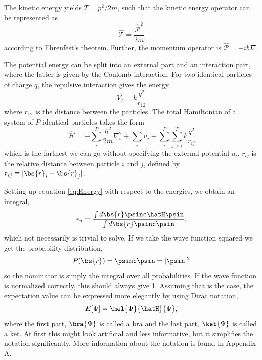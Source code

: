 The kinetic energy yields $T=p^2/2m$, such that the kinetic energy operator can be represented as 
\begin{equation}
\hat{\mathcal{T}}=\frac{\hat{\mathcal{P}}^2}{2m}
\end{equation}
according to Ehrenfest's theorem. Further, the momentum operator is $\hat{\mathcal{P}}=-i\hbar\nabla$.

The potential energy can be split into an external part and an interaction part, where the latter is given by the Coulomb interaction. For two identical particles of charge $q$, the repulsive interaction gives the energy
\begin{equation}
V_I=k\frac{q^2}{r_{12}}
\end{equation}
where $r_{12}$ is the distance between the particles. The total Hamiltonian of a system of $P$ identical particles takes the form
\begin{equation}
\hat{\mathcal{H}}=-\sum_i^P\frac{\hbar^2}{2m}\nabla_i^2+\sum_i^{}u_i + \sum_i^P\sum_{j>i}^Pk\frac{q^2}{r_{ij}}
\label{eq:ElectronicHamiltonian}
\end{equation}
which is the farthest we can go without specifying the external potential $u_i$. $r_{ij}$ is the relative distance between particle $i$ and $j$, defined by $r_{ij}\equiv|\bs{r}_i-\bs{r}_j|$.

Setting up equation \eqref{eq:Energy} with respect to the energies, we obtain an integral,
\begin{equation}
\epsilon_n=\frac{\int d\bs{r}\psinc\hatH\psin}{\int d\bs{r}\psinc\psin},
\label{eq:energyintegral}
\end{equation}
which not necessarily is trivial to solve. If we take the wave function squared we get the probability distribution,
\begin{equation}
P(\bs{r})=\psinc\psin=|\psin|^2
\end{equation}
so the nominator is simply the integral over all probabilities. If the wave function is normalized correctly, this should always give 1. Assuming that is the case, the expectation value can be expressed more elegantly by using Dirac notation,
\begin{equation}
E[\Psi]=\mel{\Psi}{\hatH}{\Psi},
\end{equation}
where the first part, $\bra{\Psi}$ is called a bra and the last part, $\ket{\Psi}$ is called a ket. At first this might look artificial and less informative, but it simplifies the notation significantly. More information about the notation is found in Appendix A. 

